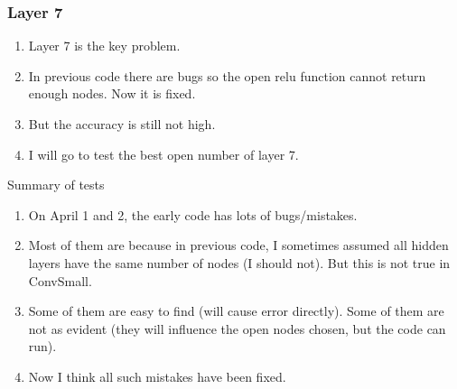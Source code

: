 \documentclass[10pt,table, UTF8]{beamer}
\theoremstyle{mydef}
\numberwithin{equation}{section}
\begin{document}
\begin{frame}
	\frametitle{Layer 7}
	
	
	\begin{enumerate}
		\item Layer 7 is the key problem.
		
		\vspace*{2ex}
		
		\item In previous code there are bugs so the open relu function cannot return enough nodes. Now it is fixed.
		
		\vspace*{2ex}
		
		\item  But the accuracy is still not high.
		
		\vspace*{2ex}
		
		\item  I will go to test the best open number of layer 7.
		
		
	\end{enumerate}
	
	
\end{frame}

\begin{frame}{Summary of tests}
	\begin{enumerate}
		\item  On  April 1 and 2, the early code has lots of bugs/mistakes. 
		
		\vspace*{2ex}
		
		\item  Most of them are because in previous code, I sometimes assumed all hidden layers have the same number of nodes (I should not). But this is not true in ConvSmall.
		
		\vspace*{2ex}
		
		\item  Some of them are easy to find (will cause error directly). Some of them are not as evident (they will influence the open nodes chosen, but the code can run).
		
		\vspace*{2ex}
		
		\item  Now I think all such mistakes have been fixed.
	\end{enumerate}
\end{frame}
\end{document}
